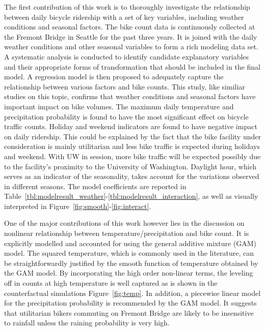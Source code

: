 \documentclass [11pt, proquest] {uwthesis}[2015/03/03]
\begin{document}
The first contribution of this work is to thoroughly investigate the relationship between daily bicycle ridership with a set of key variables, including weather conditions and seasonal factors. The bike count data is continuously collected at the Fremont Bridge in Seattle for the past three years. It is joined with the daily weather conditions and other seasonal variables to form a rich modeling data set. A systematic analysis is conducted to identify candidate explanatory variables and their appropriate forms of transformation that should be included in the final model. A regression model is then proposed to adequately capture the relationship between various factors and bike counts. This study, like similiar studies on this topic, confirms that weather conditions and seasonal factors have important impact on bike volumes. The maximum daily temperature and precipitation probability is found to have the most significant effect on bicycle traffic counts. Holiday and weekend indicators are found to have negative impact on daily ridership. This could be explained by the fact that the bike facility under consideration is mainly utilitarian and less bike traffic is expected during holidays and weekend. With UW in session, more bike traffic will be expected possibly due to the facility's proximity to the University of Washington. Daylight hour, which serves as an indicator of the seasonality, takes account for the variations observed in different seasons. The model coefficients are reported in Table~\ref{tbl:modelresult_weather}-\ref{tbl:modelresult_interaction}, as well as visually interpreted in Figure~\ref{fig:smooth}-\ref{fig:interact}.

One of the major contributions of this work however lies in the discussion on nonlinear relationship between temperature/precipitation and bike count. It is explicitly modelled and accounted for using the general additive mixture (GAM) model. The squared temperature, which is commonly used in the literature, can be straightforwardly justified by the smooth function of temperature obtained by the GAM model. By incorporating the high order non-linear terms, the leveling off in counts at high temperature is well captured as is shown in the counterfactual simulations Figure~\ref{fig:temp}. In addition, a piecewise linear model for the precipitation probability is recommended by the GAM model. It suggests that utilitarian bikers commuting on Fremont Bridge are likely to be insensitive to rainfall unless the raining probability is very high.
\end{document}
